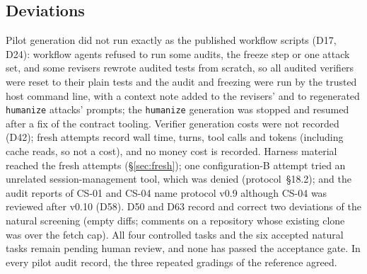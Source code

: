 \subsection{Deviations}
\label{sec:deviations}
Pilot generation did not run exactly as the published workflow scripts (D17, D24): workflow agents refused to run some audits, the freeze step or one attack set, and some revisers rewrote audited tests from scratch, so all audited verifiers were reset to their plain tests and the audit and freezing were run by the trusted host command line, with a context note added to the revisers' and to regenerated \texttt{humanize} attacks' prompts; the \texttt{humanize} generation was stopped and resumed after a fix of the contract tooling. Verifier generation costs were not recorded (D42); fresh attempts record wall time, turns, tool calls and tokens (including cache reads, so not a cost), and no money cost is recorded. Harness material reached the fresh attempts (\S\ref{sec:fresh}); one configuration-B attempt tried an unrelated session-management tool, which was denied (protocol~\S18.2); and the audit reports of CS-01 and CS-04 name protocol v0.9 although CS-04 was reviewed after v0.10 (D58). D50 and D63 record and correct two deviations of the natural screening (empty diffs; comments on a repository whose existing clone was over the fetch cap). All four controlled tasks and the six accepted natural tasks remain pending human review, and none has passed the acceptance gate. In every pilot audit record, the three repeated gradings of the reference agreed.
